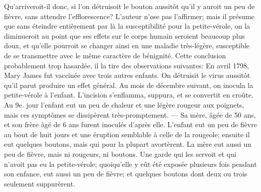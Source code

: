 Qu'arriveroit-il donc, si l'on détruisoit le bouton aussitôt qu'il y auroit un peu de fièvre, sans attendre l'efflorescence? L'auteur n'ose pas l'affirmer; mais il présume que sans éteindre entièrement par là la susceptibilité pour la petite-vérole, on la diminueroit au point que ses effets sur le corps humain seroient beaucoup plus doux, et qu'elle pourroit se changer ainsi en une maladie très-légère, susceptible de se transmettre avec le même caractère de bénignité. Cette conclusion probablement trop hasardée, il la tire des observations suivantes:
En avril 1798, Mary James fut vaccinée avec trois autres enfants. On détruisit le virus aussitôt qu'il parut produire un effet général. Au mois de décembre suivant, on inocula la petite-vérole à l'enfant. L'incision s'enflamma,\setcounter{page}{285} suppura, et se convertit en croûte. Au 9e. jour l'enfant eut un peu de chaleur et une légère rougeur aux poignets, mais ces symptômes se dissipèrent très-promptement. — Sa mère, âgée de 50 ans, et son frère âgé de 6 ans furent inoculés d'après elle. L'enfant eut un peu de fièvre au bout de huit jours et une éruption semblable à celle de la rougeole; ensuite il eut quelques boutons, mais qui pour la plupart avortèrent. La mère eut aussi un peu de fièvre, mais ni rougeurs, ni boutons. Une garde qui les servoit et qui n'avoit pas eu la petite-vérole; quoiqu'elle y eût été exposée plusieurs fois pendant son enfance, eut aussi un peu de fièvre; et quelques boutons dont deux ou trois seulement suppurèrent.
